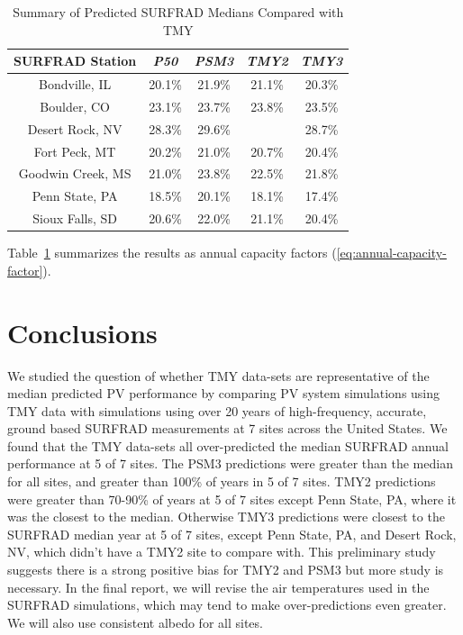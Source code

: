 \documentclass[conference]{IEEEtran}
\begin{document}
\begin{table}[htbp]
\caption{Summary of Predicted SURFRAD Medians Compared with TMY}
\begin{center}
\begin{tabular}{|c|c|c|c|c|}
\hline
\textbf{SURFRAD Station} & \textbf{\textit{P50}}& \textbf{\textit{PSM3}}& \textbf{\textit{TMY2}}& \textbf{\textit{TMY3}} \\
\hline
Bondville, IL    & 20.1\%& 21.9\%& 21.1\%& 20.3\% \\
Boulder, CO      & 23.1\%& 23.7\%& 23.8\%& 23.5\% \\
Desert Rock, NV  & 28.3\%& 29.6\%&       & 28.7\% \\
Fort Peck, MT    & 20.2\%& 21.0\%& 20.7\%& 20.4\% \\
Goodwin Creek, MS& 21.0\%& 23.8\%& 22.5\%& 21.8\% \\
Penn State, PA   & 18.5\%& 20.1\%& 18.1\%& 17.4\% \\
Sioux Falls, SD  & 20.6\%& 22.0\%& 21.1\%& 20.4\% \\
\hline
\end{tabular}
\label{table:surfrad-tmy-summary}
\end{center}
\end{table}

Table~\ref{table:surfrad-tmy-summary} summarizes the results as annual capacity factors (\ref{eq:annual-capacity-factor}).

\section{Conclusions}
We studied the question of whether TMY data-sets are representative of the median predicted PV performance by comparing PV system simulations using TMY data with simulations using over 20 years of high-frequency, accurate, ground based SURFRAD measurements at 7 sites across the United States. We found that the TMY data-sets all over-predicted the median SURFRAD annual performance at 5 of 7 sites. The PSM3 predictions were greater than the median for all sites, and greater than 100\% of years in 5 of 7 sites. TMY2 predictions were greater than 70-90\% of years at 5 of 7 sites except Penn State, PA, where it was the closest to the median. Otherwise TMY3 predictions were closest to the SURFRAD median year at 5 of 7 sites, except Penn State, PA, and Desert Rock, NV, which didn't have a TMY2 site to compare with. This preliminary study suggests there is a strong positive bias for TMY2 and PSM3 but more study is necessary. In the final report, we will revise the air temperatures used in the SURFRAD simulations, which may tend to make over-predictions even greater. We will also use consistent albedo for all sites.



\end{document}

